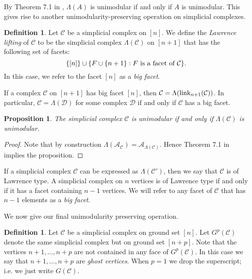 \documentclass[letterpaper,12pt]{amsart}
\theoremstyle{plain}
\newtheorem{prop}[thm]{Proposition}
\theoremstyle{definition}
\newtheorem{defn}[thm]{Definition}
\theoremstyle{remark}
\newcommand{\calc}{\mathcal{C}}
\newcommand{\link}{\textnormal{link}}
\begin{document}
By Theorem 7.1 in \cite{sturmfels}, $\Lambda(A)$ is unimodular if and only if $A$ is unimodular.
This gives rise to another unimodularity-preserving operation on simplicial complexes.

\begin{defn}\label{def:lawrence}
	Let $\mathcal{C}$ be a simplicial complex on $[n]$.
	We define the \emph{Lawrence lifting} of $\mathcal{C}$
	to be the simplicial complex $\Lambda(\mathcal{C})$ on $[n+1]$ that has the following set of facets:
	\[
		\{ [n] \} \cup \{F \cup \{n+1\} : F \textnormal{ is a facet of } \mathcal{C}\}.
	\]
	In this case, we refer to the facet $[n]$ as a \emph{big facet}.
\end{defn}

If a complex $\mathcal{C}$ on $[n+1]$ has big facet $[n]$,
then $\mathcal{C} = \Lambda(\link_{n+1}(\mathcal{C}))$.
In particular, $\mathcal{C} = \Lambda(\mathcal{D})$ for some complex $\mathcal{D}$
if and only if $\mathcal{C}$ has a big facet.




\begin{prop}\label{lawrence}
	The simplicial complex $\mathcal{C}$ is unimodular if and only if $\Lambda(\mathcal{C})$ is unimodular.
\end{prop}

\begin{proof}
	Note that by construction $\Lambda(\mathcal{A}_{\mathcal{C}}) = \mathcal{A}_{\Lambda(\mathcal{C})}$.
	Hence Theorem 7.1 in \cite{sturmfels} implies the proposition.
\end{proof}

If a simplicial complex $\mathcal{C}$ can be expressed as $\Lambda(\mathcal{C'})$,
then we say that $\mathcal{C}$ is of Lawrence type.
A simplicial complex on $n$ vertices is of Lawrence type if and only if it has a facet containing $n-1$ vertices.  We will refer to any facet of $\calc$ that has $n-1$ elements as a \emph{big facet}.

We now give our final unimodularity preserving operation.

\begin{defn}
	Let $\mathcal{C}$ be a simplicial complex on ground set $[n]$.
	Let $G^p(\mathcal{C})$ denote the same simplicial complex but on ground set $[n+p]$.
	Note that the vertices $n+1,\dots,n+p$ are not contained in any face of $G^p(\mathcal{C})$.
	In this case we say that $n+1,\dots,n+p$ are \emph{ghost vertices}.
	When $p = 1$ we drop the superscript; i.e. we just write $G(\mathcal{C})$.
\end{defn}
\end{document}
